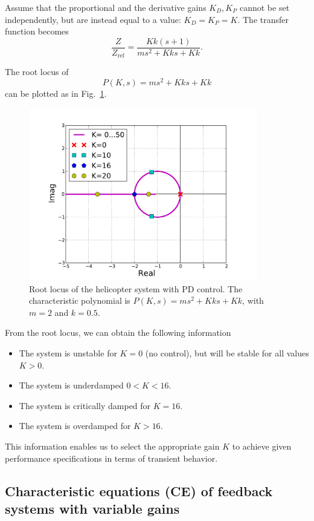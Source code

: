 \documentclass[a4paper,11pt]{report}
\theoremstyle{definition}
\newcommand{\re}{\mathrm{ref}}
\begin{document}
Assume that the proportional and the derivative gains $K_D,K_P$ cannot
be set independently, but are instead equal to a value:
$K_D=K_P=K$. The transfer function becomes
\[
\frac{Z}{Z_\re} = \frac{Kk(s+1)}{ms^2+Kks+Kk}.
\]

The root locus of 
\begin{equation}
  \label{eq:helicopd}
  P(K,s)= ms^2+Kks+Kk
\end{equation}
can be plotted as in Fig.~\ref{fig:rlocusex2}.

\begin{figure}[H]
  \centering
  \includegraphics[width=10cm]{fig/rlocusex2.pdf}
  \caption{Root locus of the helicopter system with PD control. The
    characteristic polynomial is $P(K,s)= ms^2+Kks+Kk$, with $m=2$ and
    $k=0.5$.}
  \label{fig:rlocusex2}
\end{figure}

From the root locus, we can obtain the following information
\begin{itemize}
\item The system is unstable for $K=0$ (no control), but will be
  stable for all values $K>0$.
\item The system is underdamped $0<K<16$.
\item The system is critically damped for $K=16$.
\item The system is overdamped for $K>16$.
\end{itemize}

This information enables us to select the appropriate gain $K$ to
achieve given performance specifications in terms of transient
behavior.


\subsection{Characteristic equations (CE) of feedback systems with
  variable gains}
\end{document}
